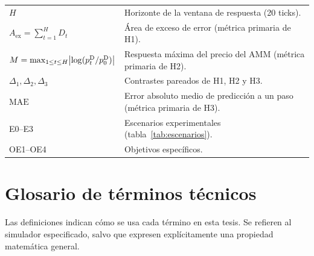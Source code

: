 \begin{center}
\begin{tabularx}{\textwidth}{@{}l X@{}}
$H$ & Horizonte de la ventana de respuesta (20 ticks). \\
$A_{\mathrm{ex}} = \sum_{t=1}^{H} D_t$ & Área de exceso de error (métrica primaria de H1). \\
$M = \max_{1\le t\le H}\bigl|\log(p^{\mathrm{D}}_t/p^{\mathrm{D}}_0)\bigr|$ & Respuesta máxima del precio del AMM (métrica primaria de H2). \\
$\Delta_1,\Delta_2,\Delta_3$ & Contrastes pareados de H1, H2 y H3. \\
$\mathrm{MAE}$ & Error absoluto medio de predicción a un paso (métrica primaria de H3). \\
E0--E3 & Escenarios experimentales (tabla~\ref{tab:escenarios}). \\
OE1--OE4 & Objetivos específicos. \\
\bottomrule
\end{tabularx}
\end{center}

\section*{Glosario de términos técnicos}
{}

\begingroup
\small
\setlength{\parskip}{0.15em}
Las definiciones indican cómo se usa cada término en esta tesis. Se refieren al
simulador especificado, salvo que expresen explícitamente una propiedad matemática general.


